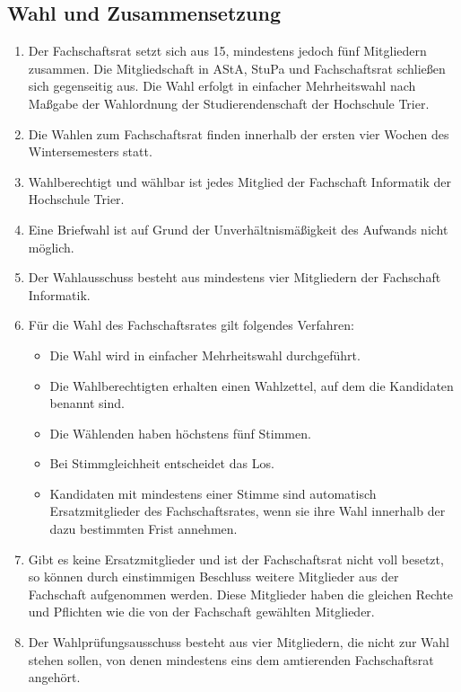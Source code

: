 \subsection{Wahl und Zusammensetzung}
\label{sec:zusammensetzung}
\begin{enumerate}
\item Der Fachschaftsrat setzt sich aus 15, mindestens jedoch fünf Mitgliedern zusammen. Die Mitgliedschaft in AStA, StuPa und Fachschaftsrat schließen sich gegenseitig aus. Die Wahl erfolgt in einfacher Mehrheitswahl nach Maßgabe der Wahlordnung der Studierendenschaft der Hochschule Trier.
\item Die Wahlen zum Fachschaftsrat finden innerhalb der ersten vier Wochen des Wintersemesters statt.
\item Wahlberechtigt und wählbar ist jedes Mitglied der Fachschaft Informatik der Hochschule Trier.
\item Eine Briefwahl ist auf Grund der Unverhältnismäßigkeit des Aufwands nicht möglich.
\item Der Wahlausschuss besteht aus mindestens vier Mitgliedern der Fachschaft Informatik.
\item Für die Wahl des Fachschaftsrates gilt folgendes Verfahren:
\begin{itemize}
\item Die Wahl wird in einfacher Mehrheitswahl durchgeführt.
\item Die Wahlberechtigten erhalten einen Wahlzettel, auf dem die Kandidaten benannt sind.
\item Die Wählenden haben höchstens fünf Stimmen.
\item Bei Stimmgleichheit entscheidet das Los.
\item Kandidaten mit mindestens einer Stimme sind automatisch Ersatzmitglieder des Fachschaftsrates, wenn sie ihre Wahl innerhalb der dazu bestimmten Frist annehmen.
\end{itemize}
\item \label{ersatz} Gibt es keine Ersatzmitglieder und ist der Fachschaftsrat nicht voll besetzt, so können durch einstimmigen Beschluss weitere Mitglieder aus der Fachschaft aufgenommen werden. Diese Mitglieder haben die gleichen Rechte und Pflichten wie die von der Fachschaft gewählten Mitglieder.
\item Der Wahlprüfungsausschuss besteht aus vier Mitgliedern, die nicht zur Wahl stehen sollen, von denen mindestens eins dem amtierenden Fachschaftsrat angehört.
\end{enumerate}

